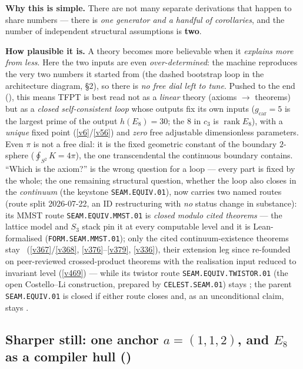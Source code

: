\documentclass[11pt,a4paper]{article}
\newcommand{\cthree}{c_3}
\newcommand{\gcar}{g_{\mathrm{car}}}
\begin{document}
\smallskip
\noindent\textbf{Why this is simple.} There are not many separate derivations that happen to share numbers ---
there is \emph{one generator and a handful of corollaries}, and the number of independent structural
assumptions is \textbf{two}.

\smallskip
\noindent\textbf{How plausible it is.} A theory becomes more believable when it \emph{explains more from less}.
Here the two inputs are even \emph{over-determined}: the machine reproduces the very two numbers it
started from (the dashed bootstrap loop in the architecture diagram, \S2), so there is \emph{no free
dial left to tune}. Pushed to the end (), this means TFPT is best read not as a
\emph{linear} theory (axioms $\to$ theorems) but as a \emph{closed self-consistent loop} whose outputs fix its own
inputs ($\gcar{=}5$ is the largest prime of the output $h(E_8){=}30$; the $8$ in $\cthree$ is $\operatorname{rank}E_8$),
with a \emph{unique} fixed point (\vref{v6}/\vref{v56}) and \emph{zero} free adjustable dimensionless parameters.
Even $\pi$ is not a free dial: it is the fixed geometric constant of the boundary $2$-sphere
($\oint_{S^2}K=4\pi$), the one transcendental the continuous boundary contains. ``Which is the axiom?'' is the
wrong question for a loop --- every part is fixed by the whole; the one remaining structural question, whether the loop
also closes in the \emph{continuum} (the keystone \texttt{SEAM.EQUIV.01}), now carries two named routes (route
split 2026-07-22, an ID restructuring with \emph{no} status change in substance): its MMST route
\texttt{SEAM.EQUIV.MMST.01} is \emph{closed modulo cited
theorems} --- the lattice model and $S_3$ stack pin it at every computable level and it is Lean-formalised
(\texttt{FORM.SEAM.MMST.01}); only the cited continuum-existence theorems stay \mO\ (\vref{v367}/\vref{v368},
\vref{v376}--\vref{v379}, \vref{v336}), their extension leg since re-founded on peer-reviewed crossed-product
theorems with the realisation input reduced to invariant level (\vref{v469}) --- while its twistor route
\texttt{SEAM.EQUIV.TWISTOR.01} (the open Costello--Li construction, prepared by \texttt{CELEST.SEAM.01}) stays
\mO; the parent \texttt{SEAM.EQUIV.01} is closed if either route closes and, as an unconditional claim, stays \mO.

\subsection*{Sharper still: one anchor $a=(1,1,2)$, and $E_8$ as a compiler hull \texorpdfstring{(\mE)}{}}
\end{document}

